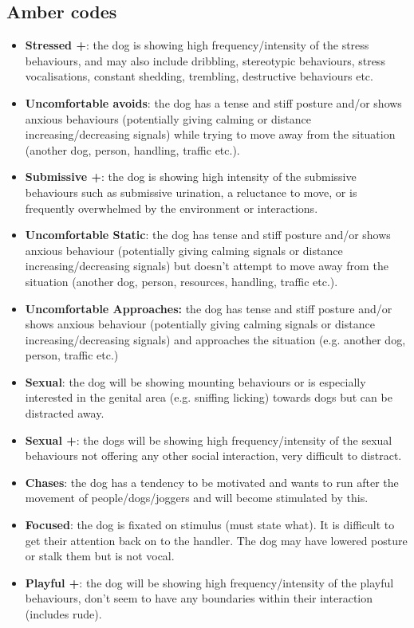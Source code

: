 \documentclass[12pt]{article}
\begin{document}
\subsection{Amber codes}
\begin{itemize}
  \item \textbf{Stressed +}: the dog is showing high frequency/intensity of the stress behaviours, and may also include dribbling, stereotypic behaviours, stress vocalisations, constant shedding, trembling, destructive behaviours etc.
  \item \textbf{Uncomfortable avoids}: the dog has a tense and stiff posture and/or shows anxious behaviours (potentially giving calming or distance increasing/decreasing signals) while trying to move away from the situation (another dog, person, handling, traffic etc.).
  \item \textbf{Submissive +}: the dog is showing high intensity of the submissive behaviours such as submissive urination, a reluctance to move, or is frequently overwhelmed by the environment or interactions.
  \item \textbf{Uncomfortable Static}: the dog has tense and stiff posture and/or shows anxious behaviour (potentially giving calming signals or distance increasing/decreasing signals) but doesn’t attempt to move away from the situation (another dog, person, resources, handling, traffic etc.).
  \item \textbf{Uncomfortable Approaches:} the dog has tense and stiff posture and/or shows anxious behaviour (potentially giving calming signals or distance increasing/decreasing signals) and approaches the situation (e.g. another dog, person, traffic etc.)
  \item \textbf{Sexual}: the dog will be showing mounting behaviours or is especially interested in the genital area (e.g. sniffing licking) towards dogs but can be distracted away.
  \item \textbf{Sexual +}: the dogs will be showing high frequency/intensity of the sexual behaviours not offering any other social interaction, very difficult to distract.
  \item \textbf{Chases}: the dog has a tendency to be motivated and wants to run after the movement of people/dogs/joggers and will become stimulated by this.
  \item \textbf{Focused}: the dog is fixated on stimulus (must state what). It is difficult to get their attention back on to the handler. The dog may have lowered posture or stalk them but is not vocal.
  \item \textbf{Playful +}: the dog will be showing high frequency/intensity of the playful behaviours, don’t seem to have any boundaries within their interaction (includes rude).

\end{itemize}
\end{document}
